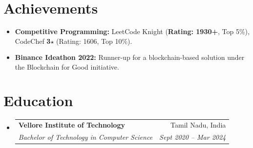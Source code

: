 \documentclass[letterpaper,11pt]{article}
\makeatletter
\newcommand{\resumeItem}[1]{
  \item\small{
    {#1 \vspace{-2pt}}
  }
}
\newcommand{\resumeSubheading}[4]{
  \vspace{-2pt}\item
    \begin{tabular*}{0.97\textwidth}[t]{l@{\extracolsep{\fill}}r}
      \textbf{#1} & #2 \\
      \textit{\small#3} & \textit{\small #4} \\
    \end{tabular*}\vspace{-6pt}
}
\newcommand{\resumeSubItem}[1]{\resumeItem{#1}\vspace{-3pt}}
\newcommand{\resumeSubHeadingListStart}{\begin{itemize}[leftmargin=0.12in, label={}]}
\newcommand{\resumeSubHeadingListEnd}{\end{itemize}}
\makeatother
\begin{document}
\section{Achievements}
\resumeSubHeadingListStart
  \resumeSubItem{
    \textbf{Competitive Programming:} LeetCode Knight (\textbf{Rating: 1930+}, Top 5\%),
    CodeChef \textbf{3$\star$} (Rating: 1606, Top 10\%).
  }
  \resumeSubItem{
    \textbf{Binance Ideathon 2022:} Runner-up for a blockchain-based solution under the Blockchain for Good initiative.
  }
\resumeSubHeadingListEnd


\section{Education}

\resumeSubHeadingListStart

  \resumeSubheading
    {Vellore Institute of Technology}{Tamil Nadu, India}
    {Bachelor of Technology in Computer Science}{Sept 2020 -- Mar 2024}
\resumeSubHeadingListEnd

\end{document}
